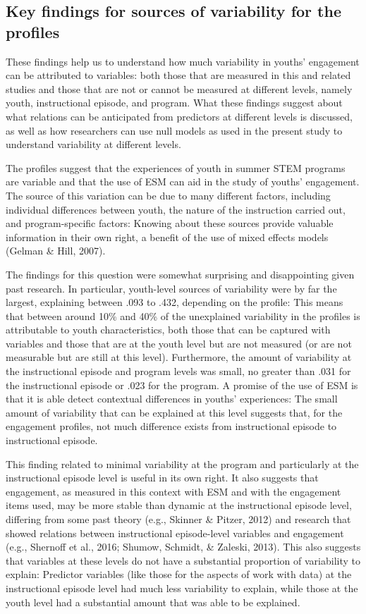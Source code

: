 \documentclass[]{msu-thesis}
\theoremstyle{definition}
\theoremstyle{definition}
\theoremstyle{definition}
\theoremstyle{remark}
\begin{document}
\subsection{Key findings for sources of variability for the
profiles}\label{key-findings-for-sources-of-variability-for-the-profiles}

These findings help us to understand how much variability in youths'
engagement can be attributed to variables: both those that are measured
in this and related studies and those that are not or cannot be measured
at different levels, namely youth, instructional episode, and program.
What these findings suggest about what relations can be anticipated from
predictors at different levels is discussed, as well as how researchers
can use null models as used in the present study to understand
variability at different levels.

The profiles suggest that the experiences of youth in summer STEM
programs are variable and that the use of ESM can aid in the study of
youths' engagement. The source of this variation can be due to many
different factors, including individual differences between youth, the
nature of the instruction carried out, and program-specific factors:
Knowing about these sources provide valuable information in their own
right, a benefit of the use of mixed effects models (Gelman \& Hill,
2007).

The findings for this question were somewhat surprising and
disappointing given past research. In particular, youth-level sources of
variability were by far the largest, explaining between .093 to .432,
depending on the profile: This means that between around 10\% and 40\%
of the unexplained variability in the profiles is attributable to youth
characteristics, both those that can be captured with variables and
those that are at the youth level but are not measured (or are not
measurable but are still at this level). Furthermore, the amount of
variability at the instructional episode and program levels was small,
no greater than .031 for the instructional episode or .023 for the
program. A promise of the use of ESM is that it is able detect
contextual differences in youths' experiences: The small amount of
variability that can be explained at this level suggests that, for the
engagement profiles, not much difference exists from instructional
episode to instructional episode.

This finding related to minimal variability at the program and
particularly at the instructional episode level is useful in its own
right. It also suggests that engagement, as measured in this context
with ESM and with the engagement items used, may be more stable than
dynamic at the instructional episode level, differing from some past
theory (e.g., Skinner \& Pitzer, 2012) and research that showed
relations between instructional episode-level variables and engagement
(e.g., Shernoff et al., 2016; Shumow, Schmidt, \& Zaleski, 2013). This
also suggests that variables at these levels do not have a substantial
proportion of variability to explain: Predictor variables (like those
for the aspects of work with data) at the instructional episode level
had much less variability to explain, while those at the youth level had
a substantial amount that was able to be explained.
\end{document}
